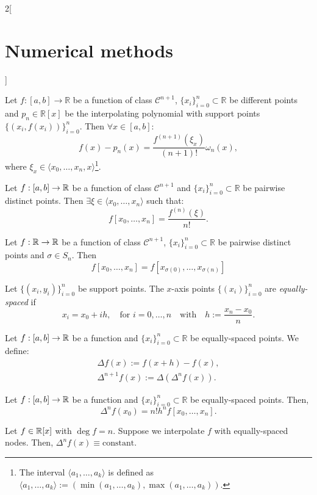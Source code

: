 \documentclass[../../../main.tex]{subfiles}
\begin{document}
\begin{multicols}{2}[\section{Numerical methods}]
\begin{prop}
\end{prop}
\begin{theorem}
Let $f:[a,b]\rightarrow\mathbb{R}$ be a function of class $\mathcal{C}^{n+1}$, $\{x_i\}_{i=0}^n\subset\mathbb{R}$ be different points and $p_n\in\mathbb{R}[x]$ be the interpolating polynomial with support points $\{(x_i,f(x_i))\}_{i=0}^n$. Then $\forall x\in[a,b]$: $$f(x)-p_n(x)=\frac{f^{(n+1)}(\xi_x)}{(n+1)!}\omega_n(x),$$ where $\xi_x\in\langle x_0,\ldots,x_n,x\rangle$\footnote{The interval $\langle a_1,\ldots,a_k\rangle$ is defined as $\langle a_1,\ldots,a_k\rangle:=(\min(a_1,\ldots,a_k),\max(a_1,\ldots,a_k))$.}.
\end{theorem}
\begin{lemma}
Let $f:[a,b]\rightarrow\mathbb{R}$ be a function of class $\mathcal{C}^{n+1}$ and $\{x_i\}_{i=0}^n\subset\mathbb{R}$ be pairwise distinct points. Then $\exists\xi\in\langle x_0,\ldots,x_n\rangle$ such that: $$f[x_0,\ldots,x_n]=\frac{f^{(n)}(\xi)}{n!}.$$ 
\end{lemma}
\begin{prop}
Let $f:\mathbb{R}\rightarrow\mathbb{R}$ be a function of class $\mathcal{C}^{n+1}$, $\{x_i\}_{i=0}^n\subset\mathbb{R}$ be pairwise distinct points and $\sigma\in S_n$. Then $$f[x_0,\ldots,x_n]=f[x_{\sigma(0)},\ldots,x_{\sigma(n)}]$$
\end{prop}
\begin{definition}
Let $\{(x_i,y_i)\}_{i=0}^n$ be support points. The $x$-axis points $\{(x_i)\}_{i=0}^n$ are \textit{equally-spaced} if $$x_i=x_0+ih,\quad\text{for }i=0,\ldots,n\quad\text{with}\quad h:=\frac{x_n-x_0}{n}.$$
\end{definition}
\begin{definition}
Let $f:[a,b]\rightarrow\mathbb{R}$ be a function and $\{x_i\}_{i=0}^n\subset\mathbb{R}$ be equally-spaced points. We define:\begin{gather*}
    \Delta f(x):=f(x+h)-f(x),\\
    \Delta^{n+1}f(x):=\Delta(\Delta^nf(x)).
\end{gather*}
\end{definition}
\begin{lemma}
Let $f:[a,b]\rightarrow\mathbb{R}$ be a function and $\{x_i\}_{i=0}^n\subset\mathbb{R}$ be equally-spaced points. Then, $$\Delta^nf(x_0)=n!h^nf[x_0,\ldots,x_n].$$
\end{lemma}
\begin{corollary}
Let $f\in\mathbb{R}[x]$ with $\deg f=n$. Suppose we interpolate $f$ with equally-spaced nodes. Then, $\Delta^nf(x)\equiv\text{constant}$.
\end{corollary}

\end{multicols}
\end{document}
